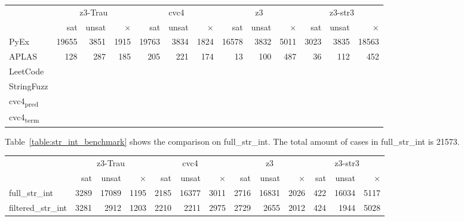 \begin{table*}[]
\centering
\caption{Results of z3-Trau, cvc4, and z3 on string benchmarks}
\begin{tabular}{l | r r r | r r r | r r r | r r r}
\hline
\multirow{2}{*}{}   & \multicolumn{3}{|c|}{z3-Trau} & \multicolumn{3}{|c}{cvc4} & \multicolumn{3}{|c}{z3} & \multicolumn{3}{|c}{z3-str3} \\
			& sat & unsat & $\times$ & sat & unsat & $\times$ & sat & unsat & $\times$ & sat & unsat & $\times$ \\ \hline
PyEx		& 19655 & 3851 & 1915 & 19763 & 3834 & 1824 & 16578 & 3832 & 5011 & 3023 & 3835 & 18563 \\ 
APLAS		&   128 &  287 &  185 & 205 & 221 & 174 & 13 & 100 & 487 & 36 & 112 &  452 \\ 
LeetCode	&  &  &  &  &  &  &  &  &  &  &  &  \\ 
StringFuzz	&  &  &  &  &  &  &  &  &  &  &  &  \\ 
cvc4\textsubscript{pred}	&  &  &  &  &  &  &  &  &  &  &  &  \\ 
cvc4\textsubscript{term}	&  &  &  &  &  &  &  &  &  &  &  &  \\ \hline
\end{tabular}
\label{table:base_benchmark}
\end{table*}

Table~\ref{table:str_int_benchmark} shows the comparison on full\_str\_int. The total amount of cases in full\_str\_int is 21573.
\begin{table*}[]
\centering
\caption{Results of z3-Trau, cvc4, and z3 on str\_int benchmark}
\begin{tabular}{l | r r r | r r r | r r r | r r r}
\hline
\multirow{2}{*}{}   & \multicolumn{3}{|c|}{z3-Trau} & \multicolumn{3}{|c}{cvc4} & \multicolumn{3}{|c}{z3} & \multicolumn{3}{|c}{z3-str3} \\
			& sat & unsat & $\times$ & sat & unsat & $\times$ & sat & unsat & $\times$ & sat & unsat & $\times$ \\ \hline
full\_str\_int		& 3289 & 17089 & 1195 & 2185 & 16377 & 3011 & 2716 & 16831 & 2026 & 422 & 16034 & 5117 \\ 
filtered\_str\_int	& 3281 & 2912 & 1203 & 2210 & 2211 & 2975 & 2729 & 2655 & 2012 & 424 & 1944 & 5028 \\ \hline
\end{tabular}
\label{table:str_int_benchmark}
\end{table*}



